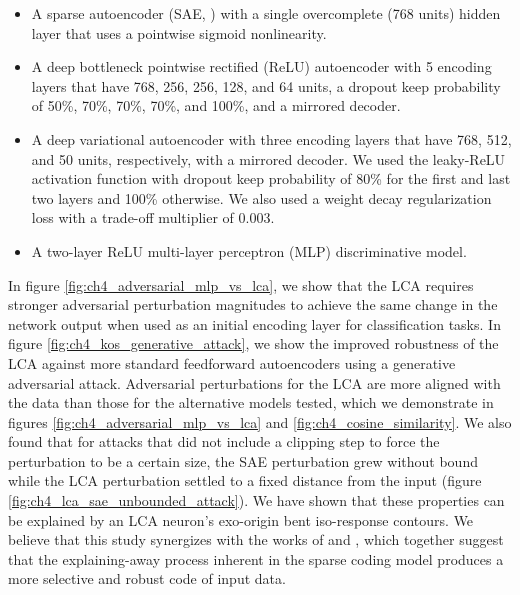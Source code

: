 \begin{itemize}
  \item A sparse autoencoder (SAE, \cite{ng2011sparse}) with a single overcomplete (768 units) hidden layer that uses a pointwise sigmoid nonlinearity.
  \item A deep bottleneck pointwise rectified (ReLU) \parencite{hahnloser2000digital, nair2010rectified} autoencoder with 5 encoding layers that have 768, 256, 256, 128, and 64 units, a dropout keep probability of 50\%, 70\%, 70\%, 70\%, and 100\%, and a mirrored decoder.
  \item A deep variational autoencoder \parencite{kingma2013auto} with three encoding layers that have 768, 512, and 50 units, respectively, with a mirrored decoder. We used the leaky-ReLU activation function \parencite{maas2013rectifier} with dropout keep probability of 80\% for the first and last two layers and 100\% otherwise. We also used a weight decay regularization loss with a trade-off multiplier of 0.003. 
  \item A two-layer ReLU multi-layer perceptron (MLP) discriminative model.
\end{itemize}

In figure \ref{fig:ch4_adversarial_mlp_vs_lca}, we show that the LCA requires stronger adversarial perturbation magnitudes to achieve the same change in the network output when used as an initial encoding layer for classification tasks. In figure \ref{fig:ch4_kos_generative_attack}, we show the improved robustness of the LCA against more standard feedforward autoencoders using a generative adversarial attack. Adversarial perturbations for the LCA are more aligned with the data than those for the alternative models tested, which we demonstrate in figures \ref{fig:ch4_adversarial_mlp_vs_lca} and \ref{fig:ch4_cosine_similarity}. We also found that for attacks that did not include a clipping step to force the perturbation to be a certain size, the SAE perturbation grew without bound while the LCA perturbation settled to a fixed distance from the input (figure \ref{fig:ch4_lca_sae_unbounded_attack}). We have shown that these properties can be explained by an LCA neuron's exo-origin bent iso-response contours. We believe that this study synergizes with the works of \parencite{zhu2013visual} and \parencite{golden2016conjectures}, which together suggest that the explaining-away process inherent in the sparse coding model produces a more selective and robust code of input data.


